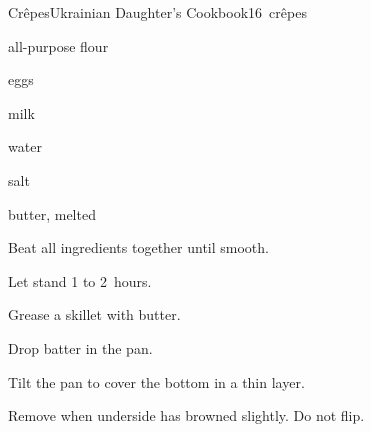 \begin{recipe}{Cr\^epes}{Ukrainian Daughter's Cookbook}{16~cr\^epes}

\begin{ingredients}
\item {} all-purpose flour
\item {} eggs
\item \C{\half} milk
\item \C{\half} water
\item \tp{\quarter} salt
\item {} butter, melted
\end{ingredients}

\begin{directions}
\item Beat all ingredients together until smooth.
\item Let stand 1 to 2~hours.
\item Grease a skillet with butter.
\item Drop  batter in the pan.
\item Tilt the pan to cover the bottom in a thin layer.
\item Remove when underside has browned slightly. Do not flip.
\end{directions}

\end{recipe}
